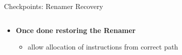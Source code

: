 \documentclass[aspectratio=169,12pt]{beamer}
\begin{document}
\begin{frame}{Checkpoints: Renamer Recovery}
    \centering
    
    \vspace{0.5cm}
    \begin{columns}[T]
        \begin{column}{0.9\textwidth}
            \begin{itemize}
                \item \textbf{Once done restoring the Renamer}
                \begin{itemize}
                    \item allow allocation of instructions from correct path
                \end{itemize}
            \end{itemize}
        \end{column}
    \end{columns}
\end{frame}
\end{document}

